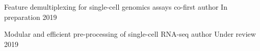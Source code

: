 

\begin{cvhonors}

  \cvhonor
    {Feature demultiplexing for single-cell genomics assays} %
    {co-first author} %
    {In preparation} %
    {2019} %


  \cvhonor
    {Modular and efficient pre-processing of single-cell RNA-seq} %
    {author} %
    {Under review} %
    {2019} %
\end{cvhonors}
